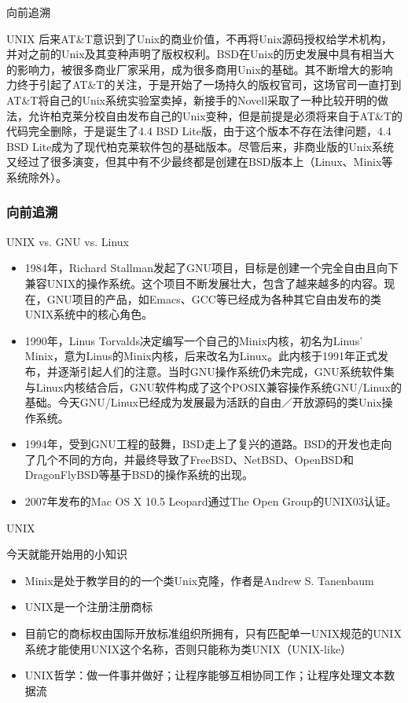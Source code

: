 \documentclass{beamer}
\begin{document}
\begin{frame}[t]{向前追溯}
    \begin{block}
        {UNIX}
        \scriptsize
后来AT\&T意识到了Unix的商业价值，不再将Unix源码授权给学术机构，并对之前的Unix及其变种声明了版权权利。BSD在Unix的历史发展中具有相当大的影响力，被很多商业厂家采用，成为很多商用Unix的基础。其不断增大的影响力终于引起了AT\&T的关注，于是开始了一场持久的版权官司，这场官司一直打到AT\&T将自己的Unix系统实验室卖掉，新接手的Novell采取了一种比较开明的做法，允许柏克莱分校自由发布自己的Unix变种，但是前提是必须将来自于AT\&T的代码完全删除，于是诞生了4.4 BSD Lite版，由于这个版本不存在法律问题，4.4 BSD Lite成为了现代柏克莱软件包的基础版本。尽管后来，非商业版的Unix系统又经过了很多演变，但其中有不少最终都是创建在BSD版本上（Linux、Minix等系统除外）。
    \end{block}
\end{frame}

\begin{frame}
  \frametitle{向前追溯}
	\begin{block}{UNIX vs. GNU vs. Linux}
		\scriptsize
		\begin{itemize}
			\item 1984年，Richard Stallman发起了GNU项目，目标是创建一个完全自由且向下兼容UNIX的操作系统。这个项目不断发展壮大，包含了越来越多的内容。现在，GNU项目的产品，如Emacs、GCC等已经成为各种其它自由发布的类UNIX系统中的核心角色。
			\item 1990年，Linus Torvalds决定编写一个自己的Minix内核，初名为Linus' Minix，意为Linus的Minix内核，后来改名为Linux。此内核于1991年正式发布，并逐渐引起人们的注意。当时GNU操作系统仍未完成，GNU系统软件集与Linux内核结合后，GNU软件构成了这个POSIX兼容操作系统GNU/Linux的基础。今天GNU/Linux已经成为发展最为活跃的自由／开放源码的类Unix操作系统。
			\item 1994年，受到GNU工程的鼓舞，BSD走上了复兴的道路。BSD的开发也走向了几个不同的方向，并最终导致了FreeBSD、NetBSD、OpenBSD和DragonFlyBSD等基于BSD的操作系统的出现。
			\item 2007年发布的Mac OS X 10.5 Leopard通过The Open Group的UNIX03认证。
		\end{itemize}
		
	\end{block}
\end{frame}
\begin{frame}[t]{UNIX}
    \begin{block}{今天就能开始用的小知识}
        \begin{itemize}
            \item Minix是处于教学目的的一个类Unix克隆，作者是Andrew S. Tanenbaum
            \item UNIX是一个注册注册商标
            \item 目前它的商标权由国际开放标准组织所拥有，只有匹配单一UNIX规范的UNIX系统才能使用UNIX这个名称，否则只能称为类UNIX（UNIX-like）
            \item UNIX哲学：做一件事并做好；让程序能够互相协同工作；让程序处理文本数据流
        \end{itemize}
    \end{block}
\end{frame}
\end{document}
